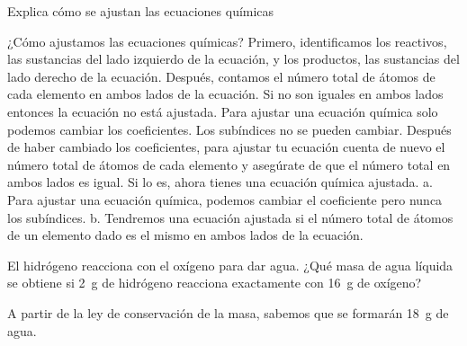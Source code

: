 \begin{exercise}
    Explica cómo se ajustan las ecuaciones químicas
    \begin{solu}
        ¿Cómo ajustamos las ecuaciones químicas? Primero,
        identificamos los reactivos, las sustancias del
        lado izquierdo de la ecuación, y los productos, las
        sustancias del lado derecho de la ecuación.
        Después, contamos el número total de átomos de cada
        elemento en ambos lados de la ecuación. Si no son
        iguales en ambos lados entonces la ecuación no está
        ajustada.
        Para ajustar una ecuación química solo podemos cambiar
        los coeficientes. Los subíndices no se pueden cambiar.
        Después de haber cambiado los coeficientes, para ajustar
        tu ecuación cuenta de nuevo el número total de átomos de
        cada elemento y asegúrate de que el número total en
        ambos lados es igual. Si lo es, ahora tienes
        una ecuación química ajustada.
        a. Para ajustar una ecuación química, podemos cambiar
        el coeficiente pero nunca los subíndices.
        b. Tendremos una ecuación ajustada si el número
        total de átomos de un elemento dado es el
        mismo en ambos lados de la ecuación.
    \end{solu}
\end{exercise}

\begin{exercise}
    El hidrógeno reacciona con el oxígeno para dar agua. ¿Qué masa de agua líquida se obtiene si \qty{2}{\g} de hidrógeno reacciona exactamente con \qty{16}{\g} de oxígeno?
    \begin{solu}
        A partir de la ley de conservación de la masa, sabemos que se formarán \qty{18}{\g} de agua.
    \end{solu}
\end{exercise}

